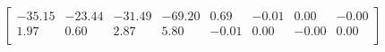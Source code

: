 \[\begin{bmatrix}
-35.15 & -23.44 & -31.49 & -69.20 & 0.69 & -0.01 & 0.00 & -0.00 \\ 
1.97 & 0.60 & 2.87 & 5.80 & -0.01 & 0.00 & -0.00 & 0.00 \\ 
\end{bmatrix}\]